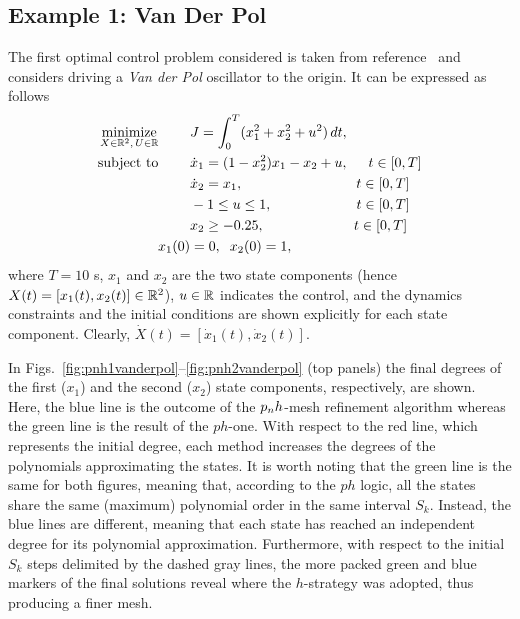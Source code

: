 \subsection*{Example 1: Van Der Pol}
The first optimal control problem considered is taken from reference~\cite{casadi:DOC:2018} and considers
driving a \emph{Van der Pol} oscillator to the origin. It can be expressed as follows
\begin{subequations}\label{eq:vanderpol}
	\begin{align}
	\underset{X \in \mathbb{R}^{2}, \, U \in \mathbb{R}}{\text{minimize}}\hspace{8mm}
	&J = \int_{0}^{T}(x_1^{2} + x_2^{2} + u^{2})\,dt,  \label{eq:vancost}\\
	\text{subject to} \hspace{8mm}
	&\dot{x}_1 = (1 - x_2^{2})x_{1} - x_2 + u, \hspace{5mm} t \in[0,T] \label{eq:vandyn1}\\
	& \dot{x}_2 = x_1, \hspace{28.5mm} t \in[0,T] \label{eq:vandyn2}\\
	& -1  \leq u \leq 1,  \hspace{21.2mm} t \in[0,T] \label{eq:vanpath1}\\
	& x_2 \geq -0.25,  \hspace{22.5mm} t \in[0,T] \label{eq:vanpath2}\\
	 x_1(0) &= 0, \hspace{2mm} x_2(0) = 1, \label{eq:initial1}		
	\end{align}
\end{subequations}
where $T = 10$ s, $x_1$ and $x_2$ are the two state components (hence $X(t) = [x_1(t), x_2(t)]\in \mathbb{R}^2$), $u\in\mathbb{R}$ indicates the control, and the dynamics constraints and the initial conditions are shown explicitly for each state component. Clearly, $\dot{X}(t) = [\dot{x}_1(t), \dot{x}_2(t)]$.

In Figs.~\ref{fig:pnh1vanderpol}--\ref{fig:pnh2vanderpol} (top panels) the final degrees of the first ($x_1$) and the second ($x_2$) state components, respectively, are shown. Here, the blue line is the outcome of the $p_{n}h$-mesh refinement algorithm whereas the green line is the result of the $ph$-one. With respect to the red line, which represents the initial degree, each method increases the degrees of the polynomials approximating the states. It is worth noting that the green line is the same for both figures, meaning that, according to the $ph$ logic, all the states share the same (maximum) polynomial order in the same interval $S_k$. Instead, the blue lines are different, meaning that each state has reached an independent degree for its polynomial approximation.
Furthermore, with respect to the initial $S_k$ steps delimited by the dashed gray lines, the more packed green and blue markers of the final solutions reveal where the $h$-strategy was adopted, thus producing a finer mesh.

